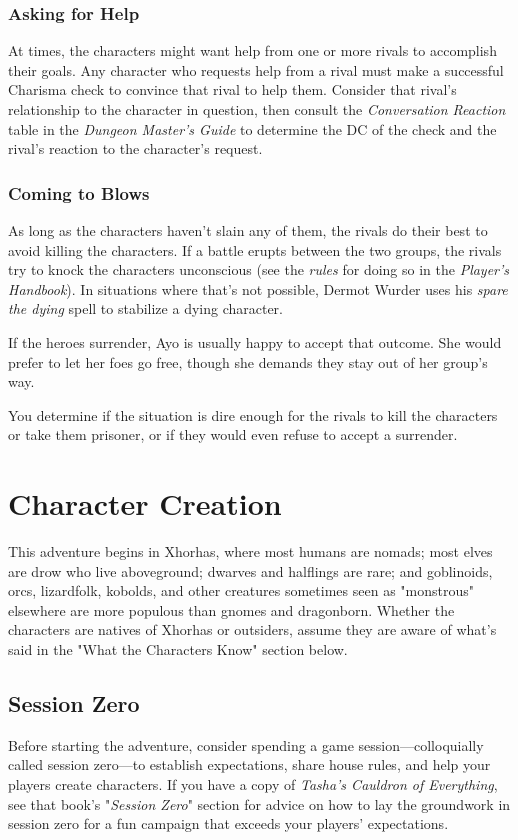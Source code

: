 \documentclass[10pt,a4paper,twoside,fancy,bg=print,twocolumn,openany,nodeprecatedcode]{dndbook}
\begin{document}
\subsubsection{Asking for Help}
At times, the characters might want help from one or more rivals to accomplish their goals. Any character who requests help from a rival must make a successful Charisma check to convince that rival to help them. Consider that rival's relationship to the character in question, then consult the \textit{Conversation Reaction} table in the \textit{Dungeon Master's Guide} to determine the DC of the check and the rival's reaction to the character's request.

\subsubsection{Coming to Blows}
As long as the characters haven't slain any of them, the rivals do their best to avoid killing the characters. If a battle erupts between the two groups, the rivals try to knock the characters unconscious (see the \textit{rules} for doing so in the \textit{Player's Handbook}). In situations where that's not possible, Dermot Wurder uses his \textit{spare the dying} spell to stabilize a dying character.

If the heroes surrender, Ayo is usually happy to accept that outcome. She would prefer to let her foes go free, though she demands they stay out of her group's way.

You determine if the situation is dire enough for the rivals to kill the characters or take them prisoner, or if they would even refuse to accept a surrender.

\section{Character Creation}
This adventure begins in Xhorhas, where most humans are nomads; most elves are drow who live aboveground; dwarves and halflings are rare; and goblinoids, orcs, lizardfolk, kobolds, and other creatures sometimes seen as "monstrous" elsewhere are more populous than gnomes and dragonborn. Whether the characters are natives of Xhorhas or outsiders, assume they are aware of what's said in the "What the Characters Know" section below.

\subsection{Session Zero}
Before starting the adventure, consider spending a game session—colloquially called session zero—to establish expectations, share house rules, and help your players create characters. If you have a copy of \textit{Tasha's Cauldron of Everything}, see that book's "\textit{Session Zero}" section for advice on how to lay the groundwork in session zero for a fun campaign that exceeds your players' expectations.
\end{document}
